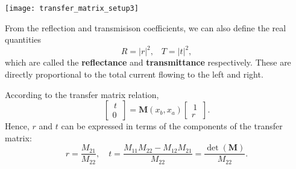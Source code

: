 \documentclass[pra,12pt]{revtex4}
\begin{document}
\begin{center}
  \texttt{[image: transfer\_matrix\_setup3]}
\end{center}

From the reflection and transmisison coefficients, we can also define
the real quantities
\begin{equation}
  R = |r|^2, \;\;\; T = |t|^2,
\end{equation}
which are called the \textbf{reflectance} and \textbf{transmittance}
respectively.  These are directly proportional to the total current
flowing to the left and right.

According to the transfer matrix relation,
\begin{equation}
  \begin{bmatrix}\,t\, \\ 0 \end{bmatrix} = \textbf{M}(x_b,x_a) \begin{bmatrix}\,1\, \\ r
\end{bmatrix}.
\end{equation}
Hence, $r$ and $t$ can be expressed in terms of the components of the
transfer matrix:
\begin{equation}
  r = \frac{M_{21}}{M_{22}}, \quad t = \frac{M_{11} M_{22} - M_{12}M_{21}}{M_{22}} = \frac{\det(\textbf{M})}{M_{22}}.
\end{equation}
\end{document}
